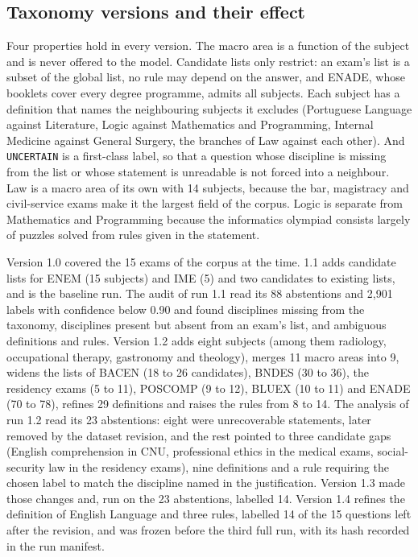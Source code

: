 \subsection{Taxonomy versions and their effect}
\label{app:ka-short-taxonomy}

Four properties hold in every version. The macro area is a function of the
subject and is never offered to the model. Candidate lists only restrict: an
exam's list is a subset of the global list, no rule may depend on the answer,
and ENADE, whose booklets cover every degree programme, admits all subjects.
Each subject has a definition that names the neighbouring subjects it
excludes (Portuguese Language against Literature, Logic against Mathematics
and Programming, Internal Medicine against General Surgery, the branches of
Law against each other). And \texttt{UNCERTAIN} is a first-class label, so
that a question whose discipline is missing from the list or whose statement
is unreadable is not forced into a neighbour. Law is a macro area of its own
with 14 subjects, because the bar, magistracy and civil-service exams make it
the largest field of the corpus. Logic is separate from Mathematics and
Programming because the informatics olympiad consists largely of puzzles
solved from rules given in the statement.

Version 1.0 covered the 15 exams of the corpus at the time. 1.1 adds
candidate lists for ENEM (15 subjects) and IME (5) and two candidates to
existing lists, and is the baseline run. The audit of run 1.1 read its 88
abstentions and 2,901 labels with confidence below 0.90 and found disciplines
missing from the taxonomy, disciplines present but absent from an exam's
list, and ambiguous definitions and rules. Version 1.2 adds eight subjects
(among them radiology, occupational therapy, gastronomy and theology), merges
11 macro areas into 9, widens the lists of BACEN (18 to 26 candidates), BNDES
(30 to 36), the residency exams (5 to 11), POSCOMP (9 to 12), BLUEX (10 to
11) and ENADE (70 to 78), refines 29 definitions and raises the rules from 8
to 14. The analysis of run 1.2 read its 23 abstentions: eight were
unrecoverable statements, later removed by the dataset revision, and the rest
pointed to three candidate gaps (English comprehension in CNU, professional
ethics in the medical exams, social-security law in the residency exams),
nine definitions and a rule requiring the chosen label to match the
discipline named in the justification. Version 1.3 made those changes and, run on the 23 abstentions,
labelled 14. Version 1.4 refines the definition of English Language and three
rules, labelled 14 of the 15 questions left after the revision, and was frozen
before the third full run, with its hash recorded in the run manifest.


